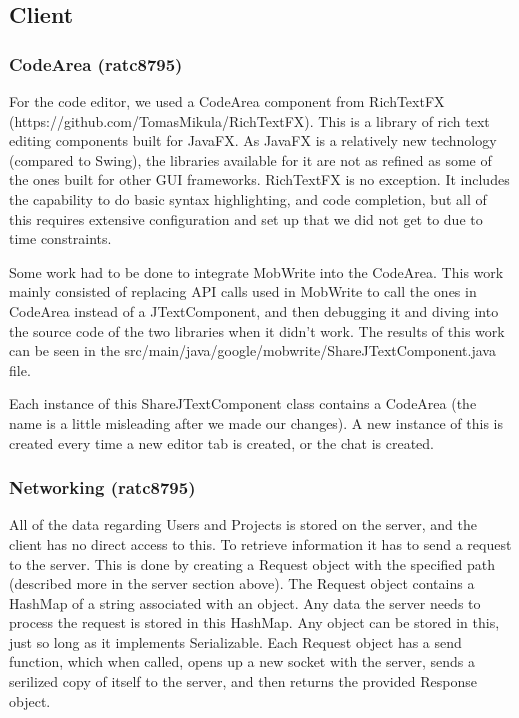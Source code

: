 \documentclass[twoside,letterpaper]{article}
\begin{document}
\newpage
\subsection{Client}

\subsubsection{CodeArea (ratc8795)}
For the code editor, we used a CodeArea component from RichTextFX (https://github.com/TomasMikula/RichTextFX). This is a library of rich text editing components built for JavaFX. As JavaFX is a relatively new technology (compared to Swing), the libraries available for it are not as refined as some of the ones built for other GUI frameworks. RichTextFX is no exception. It includes the capability to do basic syntax highlighting, and code completion, but all of this requires extensive configuration and set up that we did not get to due to time constraints.

Some work had to be done to integrate MobWrite into the CodeArea. This work mainly consisted of replacing API calls used in MobWrite to call the ones in CodeArea instead of a JTextComponent, and then debugging it and diving into the source code of the two libraries when it didn't work. The results of this work can be seen in the src/main/java/google/mobwrite/ShareJTextComponent.java file.

Each instance of this ShareJTextComponent class contains a CodeArea (the name is a little misleading after we made our changes). A new instance of this is created every time a new editor tab is created, or the chat is created.

\subsubsection{Networking (ratc8795)}
 All of the data regarding Users and Projects is stored on the server, and the client has no direct access to this. To retrieve information it has to send a request to the server. This is done by creating a Request object with the specified path (described more in the server section above). The Request object contains a HashMap of a string associated with an object. Any data the server needs to process the request is stored in this HashMap. Any object can be stored in this, just so long as it implements Serializable. Each Request object has a send function, which when called, opens up a new socket with the server, sends a serilized copy of itself to the server, and then returns the provided Response object.
\end{document}
